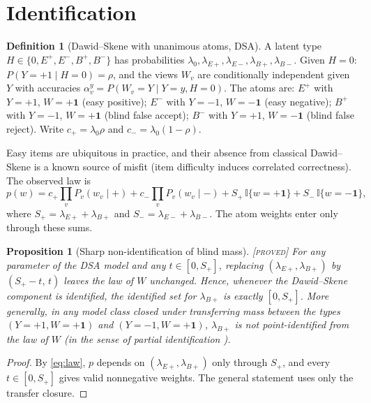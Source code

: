 \documentclass[11pt]{article}
\newtheorem{proposition}{Proposition}
\theoremstyle{definition}
\newtheorem{definition}{Definition}
\theoremstyle{remark}
\newcommand{\status}[1]{\hfill{\normalfont\small\textsc{[#1]}}}
\newcommand{\one}{\mathbf{1}}
\begin{document}
\section{Identification}

\begin{definition}[Dawid--Skene with unanimous atoms, DSA]
A latent type $H\in\{0,E^+,E^-,B^+,B^-\}$ has probabilities $\lambda_0,\lambda_{E+},\lambda_{E-},\lambda_{B+},\lambda_{B-}$.
Given $H=0$: $P(Y=+1\mid H=0)=\rho$, and the views $W_v$ are conditionally independent given $Y$ \cite{dawid1979} with accuracies $\alpha_v^{y}=P(W_v=Y\mid Y=y,H=0)$.
The atoms are: $E^+$ with $Y=+1$, $W=+\one$ (easy positive); $E^-$ with $Y=-1$, $W=-\one$ (easy negative); $B^+$ with $Y=-1$, $W=+\one$ (blind false accept); $B^-$ with $Y=+1$, $W=-\one$ (blind false reject).
Write $c_+=\lambda_0\rho$ and $c_-=\lambda_0(1-\rho)$.
\end{definition}

Easy items are ubiquitous in practice, and their absence from classical Dawid--Skene is a known source of misfit (item difficulty induces correlated correctness). The observed law is
\begin{equation}\label{eq:law}
p(w)=c_+\!\prod_v P_v(w_v\mid +)+c_-\!\prod_v P_v(w_v\mid -)+S_+\,\mathbb{I}\{w=+\one\}+S_-\,\mathbb{I}\{w=-\one\},
\end{equation}
where $S_+=\lambda_{E+}+\lambda_{B+}$ and $S_-=\lambda_{E-}+\lambda_{B-}$. The atom weights enter only through these sums.

\begin{proposition}[Sharp non-identification of blind mass]\label{prop:nonid}\status{proved}
For any parameter of the DSA model and any $t\in[0,S_+]$, replacing $(\lambda_{E+},\lambda_{B+})$ by $(S_+-t,\,t)$ leaves the law of $W$ unchanged. Hence, whenever the Dawid--Skene component is identified, the identified set for $\lambda_{B+}$ is exactly $[0,S_+]$. More generally, in any model class closed under transferring mass between the types $(Y=+1,W=+\one)$ and $(Y=-1,W=+\one)$, $\lambda_{B+}$ is not point-identified from the law of $W$ (in the sense of partial identification \cite{manski2003}).
\end{proposition}
\begin{proof}
By \eqref{eq:law}, $p$ depends on $(\lambda_{E+},\lambda_{B+})$ only through $S_+$, and every $t\in[0,S_+]$ gives valid nonnegative weights. The general statement uses only the transfer closure.
\end{proof}
\end{document}
